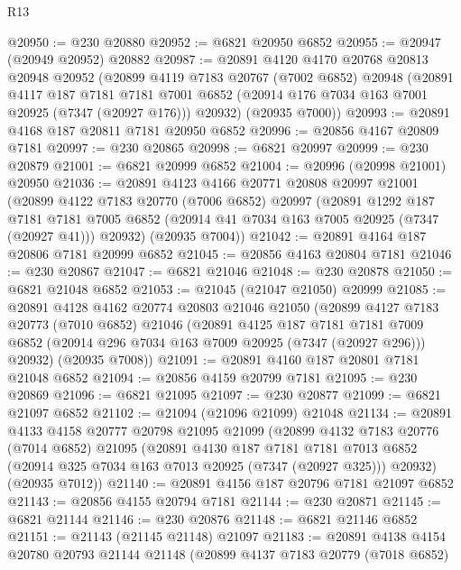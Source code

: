 \begin{lexlean}{R13}
\begin{coremodule}
@20950 := @230 @20880
@20952 := @6821 @20950 @6852
@20955 := @20947 (@20949 @20952) @20882
@20987 := @20891
    @4120
    @4170
    @20768
    @20813
    @20948
    @20952
    (@20899
      @4119
      @7183
      @20767
      (@7002 @6852)
      @20948
      (@20891
        @4117
        @187
        @7181
        @7181
        @7001
        @6852
        (@20914 @176 @7034 @163 @7001 @20925 (@7347 (@20927 @176)))
        @20932)
      (@20935 @7000))
@20993 := @20891 @4168 @187 @20811 @7181 @20950 @6852
@20996 := @20856 @4167 @20809 @7181
@20997 := @230 @20865
@20998 := @6821 @20997
@20999 := @230 @20879
@21001 := @6821 @20999 @6852
@21004 := @20996 (@20998 @21001) @20950
@21036 := @20891
    @4123
    @4166
    @20771
    @20808
    @20997
    @21001
    (@20899
      @4122
      @7183
      @20770
      (@7006 @6852)
      @20997
      (@20891
        @1292
        @187
        @7181
        @7181
        @7005
        @6852
        (@20914 @41 @7034 @163 @7005 @20925 (@7347 (@20927 @41)))
        @20932)
      (@20935 @7004))
@21042 := @20891 @4164 @187 @20806 @7181 @20999 @6852
@21045 := @20856 @4163 @20804 @7181
@21046 := @230 @20867
@21047 := @6821 @21046
@21048 := @230 @20878
@21050 := @6821 @21048 @6852
@21053 := @21045 (@21047 @21050) @20999
@21085 := @20891
    @4128
    @4162
    @20774
    @20803
    @21046
    @21050
    (@20899
      @4127
      @7183
      @20773
      (@7010 @6852)
      @21046
      (@20891
        @4125
        @187
        @7181
        @7181
        @7009
        @6852
        (@20914 @296 @7034 @163 @7009 @20925 (@7347 (@20927 @296)))
        @20932)
      (@20935 @7008))
@21091 := @20891 @4160 @187 @20801 @7181 @21048 @6852
@21094 := @20856 @4159 @20799 @7181
@21095 := @230 @20869
@21096 := @6821 @21095
@21097 := @230 @20877
@21099 := @6821 @21097 @6852
@21102 := @21094 (@21096 @21099) @21048
@21134 := @20891
    @4133
    @4158
    @20777
    @20798
    @21095
    @21099
    (@20899
      @4132
      @7183
      @20776
      (@7014 @6852)
      @21095
      (@20891
        @4130
        @187
        @7181
        @7181
        @7013
        @6852
        (@20914 @325 @7034 @163 @7013 @20925 (@7347 (@20927 @325)))
        @20932)
      (@20935 @7012))
@21140 := @20891 @4156 @187 @20796 @7181 @21097 @6852
@21143 := @20856 @4155 @20794 @7181
@21144 := @230 @20871
@21145 := @6821 @21144
@21146 := @230 @20876
@21148 := @6821 @21146 @6852
@21151 := @21143 (@21145 @21148) @21097
@21183 := @20891
    @4138
    @4154
    @20780
    @20793
    @21144
    @21148
    (@20899
      @4137
      @7183
      @20779
      (@7018 @6852)

\end{coremodule}
\end{lexlean}
